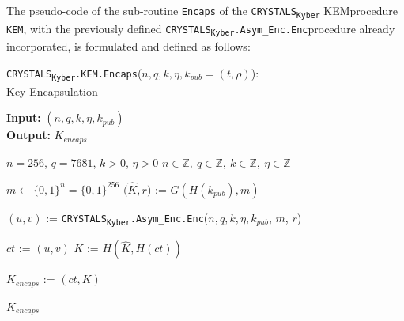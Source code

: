 \documentclass[runningheads]{llncs}
\numberwithin{equation}{section}
\begin{document}
    \vspace{2ex}
    
    \noindent The pseudo-code of the sub-routine \texttt{Encaps} of the \texorpdfstring{\texttt{CRYSTALS}\textsubscript{\texttt{Kyber}}}\/ KEM\break procedure \texttt{KEM}, with the previously defined \texorpdfstring{\texttt{CRYSTALS}\textsubscript{\texttt{Kyber}}\texttt{.Asym\_Enc}\texttt{.Enc}}\/\break procedure already incorporated, is formulated and defined as follows:
    \vspace{-2.75ex}
    \begin{algorithm}
        \caption{\texorpdfstring{\texttt{CRYSTALS}\textsubscript{\texttt{Kyber}}\texttt{.KEM}\texttt{.Encaps}($n,q,k,\eta,{k}_{pub} = (t, \rho)$)}\/:\\ \phantom{.......................................................................................}Key Encapsulation}
        \label{subrou:crystals-kyber-kem-encaps}
        
        \textbf{Input:} $\left( n, q, k, \eta, {k}_{pub} \right)$\\
        \textbf{Output:} ${K}_{encaps}$
  
        \begin{algorithmic}[1]
            \Require $n = 256$, $q = 7681$, $k > 0$, $\eta > 0$
            \Ensure $n \in \mathbb{Z},\ q \in \mathbb{Z},\ k \in \mathbb{Z},\ \eta \in \mathbb{Z}$
            
            \vspace{2ex}
            
            \State $m \gets { \{ 0 , 1 \} }^{n} = { \{ 0 , 1 \} }^{256}$
            \State $\big( \hat{K}, r \big)$ := $G( H( {k}_{pub} ) , m )$
            
            \vspace{1ex}

            \State $\left( u, v \right)$ := \texorpdfstring{\texttt{CRYSTALS}\textsubscript{\texttt{Kyber}}\texttt{.Asym\_Enc}\texttt{.Enc}}\/($n, q, k, \eta,{k}_{pub}$, $m$, $r$)
            
            \vspace{1ex}

            \State $ct$ := $(u, v)$
            \State $K$ := $H(\hat{K}, H(ct))$
            
            \vspace{1ex}

            \State ${K}_{encaps}$ := $(ct, K)$
            
            \vspace{1ex}
            
            \State \Return ${K}_{encaps}$
        \end{algorithmic}
    \end{algorithm}
    \vspace{-2ex}
\end{document}
